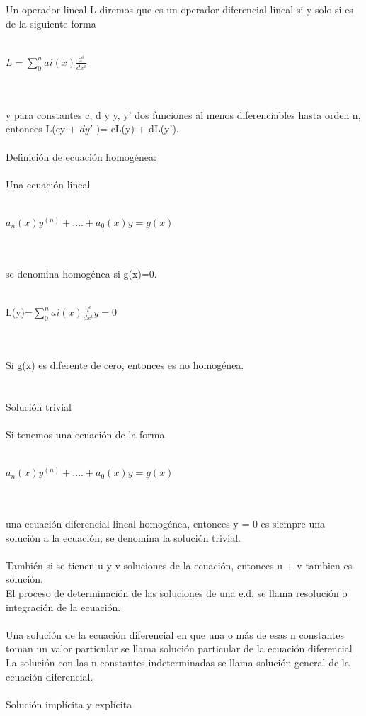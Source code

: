 \documentclass[a4paper,10pt]{article}
\begin{document}
Un operador lineal L diremos que es un operador diferencial
lineal si y solo si es de la siguiente forma\\\\
\centerline{$L= \sum_{0}^{n} ai(x)\frac{d^i}{dx^i}$}\\\\
y para constantes c, d y y, y' dos funciones al menos diferenciables hasta orden n, entonces L(cy + $dy'$ )= cL(y) + dL(y').\\\\
Definición de ecuación homogénea:\\\\
Una ecuación lineal\\\\
\centerline{$a_n (x)y^{(n)} + .... + a_0(x)y = g(x)$}\\\\
se denomina homogénea si g(x)=0.\\\\
\centerline{L(y)=$\sum_0 ^n ai(x) \frac{d^i}{dx^i}y =0 $}\\\\
Si g(x) es diferente de cero, entonces es no homogénea.\\\\\\
Solución trivial\\\\
Si tenemos una ecuación de la forma\\\\
\centerline{$a_n (x) y^{(n)} + .... +a_0 (x)y = g(x)$}\\\\
una ecuación diferencial lineal homogénea, entonces y = 0 es
siempre una solución a la ecuación; se denomina la solución trivial.\\\\
También si se tienen u y v soluciones de la ecuación, entonces u + v tambien es solución.\\
El proceso de determinación de las soluciones de una e.d. se llama
resolución o integración de la ecuación.\\\\
Una solución de la ecuación diferencial en que una o más de esas n constantes toman un valor particular se llama solución particular
de la ecuación diferencial La solución con las n constantes
indeterminadas se llama solución general de la ecuación
diferencial.\\\\
Solución implícita y explícita\\\\
\end{document}
